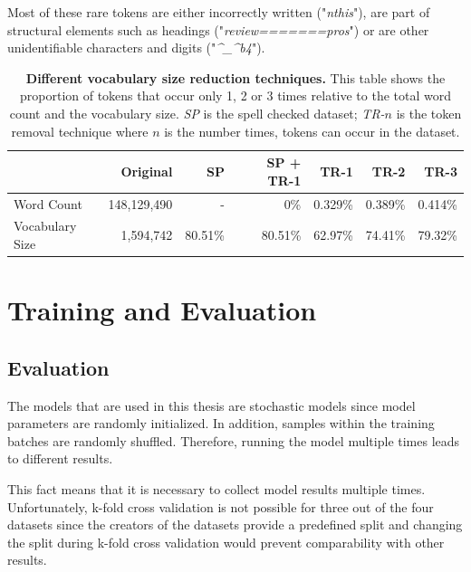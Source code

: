 Most of these rare tokens are either incorrectly written {("\textit{nthis}")}, are part of structural elements such as headings {("\textit{review=======pros}")} or are other unidentifiable characters and digits ({"\textit{\^{}\_\^{}b4}"}).

\begin{table}[]
    \centering
    \begin{tabular}{lrrrrrr}
            \toprule
                            & Original      & SP & SP + TR-1 & TR-1 & TR-2 & TR-3 \\
            \midrule
            Word Count      &148,129,490     & -              & 0\%           & 0.329\%         & 0.389\%         & 0.414\%            \\
            Vocabulary Size & 1,594,742       & 80.51\%        & 80.51\%          & 62.97\%         & 74.41\%         & 79.32\%      \\  
            \bottomrule     
    \end{tabular}

    \caption{\textbf{Different vocabulary size reduction techniques.} This table shows the proportion of tokens that occur only 1, 2 or 3 times relative to the total word count and the vocabulary size. \textit{SP} is the spell checked dataset; \textit{TR-}$n$ is the token removal technique where $n$ is the number times, tokens can occur in the dataset.}
    \label{tab:05_amazonVocabSize}
\end{table}

\section{Training and Evaluation}
\label{sec:05_TrainingAndEvaluation}

\subsection{Evaluation}

The models that are used in this thesis are stochastic models since model parameters are randomly initialized. In addition, samples within the training batches are randomly shuffled. Therefore, running the model multiple times leads to different results.
\medskip

This fact means that it is necessary to collect model results multiple times. Unfortunately, k-fold cross validation is not possible for three out of the four datasets since the creators of the datasets provide a predefined split and changing the split during k-fold cross validation would prevent comparability with other results.

